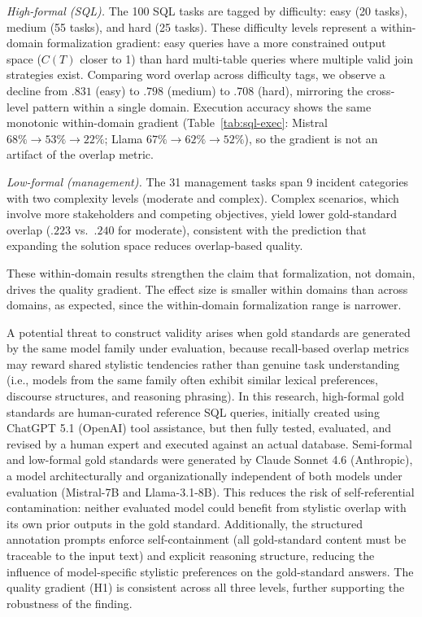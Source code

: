 \documentclass[runningheads]{llncs}
\begin{document}
\vspace{5pt}
\noindent
\textit{High-formal (SQL).}
The 100 SQL tasks are tagged by difficulty: easy (20 tasks), medium (55 tasks), and hard (25 tasks). These difficulty levels represent a within-domain formalization gradient: easy queries have a more constrained output space ($C(T)$ closer to 1) than hard multi-table queries where multiple valid join strategies exist. Comparing word overlap across difficulty tags, we observe a decline from $.831$ (easy) to $.798$ (medium) to $.708$ (hard), mirroring the cross-level pattern within a single domain. Execution accuracy shows the same monotonic within-domain gradient (Table~\ref{tab:sql-exec}: Mistral $68\%\!\to\!53\%\!\to\!22\%$; Llama $67\%\!\to\!62\%\!\to\!52\%$), so the gradient is not an artifact of the overlap metric.

\vspace{5pt}
\noindent
\textit{Low-formal (management).}
The 31 management tasks span 9 incident categories with two complexity levels (moderate and complex). Complex scenarios, which involve more stakeholders and competing objectives, yield lower gold-standard overlap ($.223$ vs.\ $.240$ for moderate), consistent with the prediction that expanding the solution space reduces overlap-based quality.

These within-domain results strengthen the claim that formalization, not domain, drives the quality gradient. The effect size is smaller within domains than across domains, as expected, since the within-domain formalization range is narrower.

A potential threat to construct validity arises when gold standards are generated by the same model family under evaluation, because recall-based overlap metrics may reward shared stylistic tendencies rather than genuine task understanding (i.e., models from the same family often exhibit similar lexical preferences, discourse structures, and reasoning phrasing). In this research, high-formal gold standards are human-curated reference SQL queries, initially created using ChatGPT 5.1 (OpenAI) tool assistance, but then fully tested, evaluated, and revised by a human expert and executed against an actual database. Semi-formal and low-formal gold standards were generated by Claude Sonnet 4.6 (Anthropic), a model architecturally and organizationally independent of both models under evaluation (Mistral-7B and Llama-3.1-8B). This reduces the risk of self-referential contamination: neither evaluated model could benefit from stylistic overlap with its own prior outputs in the gold standard. Additionally, the structured annotation prompts enforce self-containment (all gold-standard content must be traceable to the input text) and explicit reasoning structure, reducing the influence of model-specific stylistic preferences on the gold-standard answers. The quality gradient (H1) is consistent across all three levels, further supporting the robustness of the finding.
\end{document}
